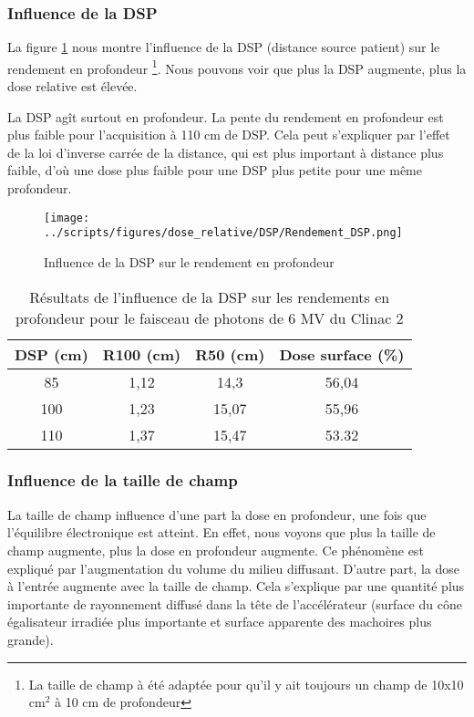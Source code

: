 \documentclass{article}
\begin{document}
\subsubsection{Influence de la DSP}

La figure \ref*{fig_rdt_dsp} nous montre l'influence de la DSP (distance source patient) sur le rendement en profondeur \footnote{La taille de champ à été adaptée pour qu'il y ait toujours un champ de 10x10 cm$^2$ à 10 cm de profondeur}. Nous pouvons voir que plus la DSP augmente, plus la dose relative est élevée.

La DSP agît surtout en profondeur. La pente du rendement en profondeur est plus faible pour l'acquisition à 110 cm de DSP. Cela peut s'expliquer par l'effet de la loi d'inverse carrée de la distance, qui est plus important à distance plus faible, d'où une dose plus faible pour une DSP plus petite pour une même profondeur.

\begin{figure}[h]
  \centering
  \texttt{[image: ../scripts/figures/dose\_relative/DSP/Rendement\_DSP.png]}
  \caption{Influence de la DSP sur le rendement en profondeur}
  \label{fig_rdt_dsp}
\end{figure}

\begin{table}[h]
  \centering
  \begin{tabular}{cccc}
    \toprule
    \textbf{DSP (cm)} & \textbf{R100 (cm)} & \textbf{R50 (cm)} & \textbf{Dose surface (\%)} \\
    \toprule
    85 & 1,12 & 14,3 & 56,04 \\
    100 & 1,23 & 15,07 & 55,96 \\
    110 & 1,37 & 15,47 & 53.32 \\
    \bottomrule
  \end{tabular}
  \caption{Résultats de l'influence de la DSP sur les rendements en profondeur pour le faisceau de photons de 6 MV du Clinac 2}
  \label{table_rdt_dsp}
\end{table}

\subsubsection{Influence de la taille de champ}

La taille de champ influence d'une part la dose en profondeur, une fois que l'équilibre électronique est atteint. En effet, nous voyons que plus la taille de champ augmente, plus la dose en profondeur augmente. Ce phénomène est expliqué par l'augmentation du volume du milieu diffusant. D'autre part, la dose à l'entrée augmente avec la taille de champ. Cela s'explique par une quantité plus importante de rayonnement diffusé dans la tête de l'accélérateur (surface du cône égalisateur irradiée plus importante et surface apparente des machoires plus grande).
\end{document}
